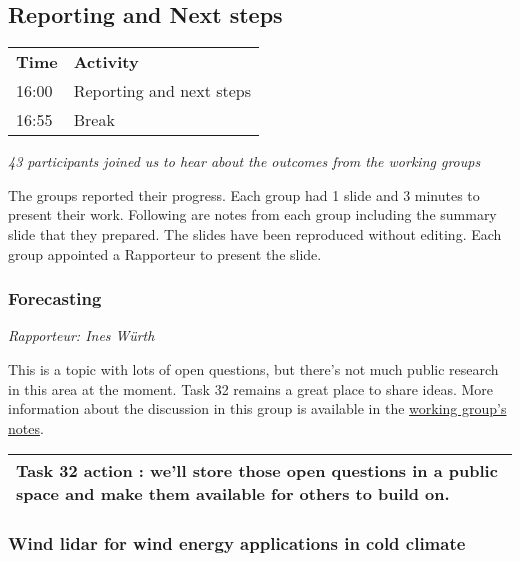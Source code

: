\subsection{Reporting and Next steps}

\begin{table}[!h]
    \centering
    \begin{tabular}{@{}|p{}|p{}|@{}}
    \rowcolor{Task32Blue2} \textbf{Time} & \textbf{Activity} \\    
    16:00 & Reporting and next steps \\
    16:55 & Break
    \end{tabular}
    \label{tab:day4-results-agenda}
\end{table}

\emph{43 participants joined us to hear about the outcomes from the working groups}

The groups reported their progress. Each group had 1 slide and 3 minutes to present their work. Following are notes from each group including the summary slide that they prepared. The slides have been reproduced without editing. Each group appointed a Rapporteur to present the slide.

\hypertarget{forecasting}{%
\subsubsection{Forecasting}\label{forecasting}}

\emph{Rapporteur: Ines Würth}

This is a topic with lots of open questions, but there's not much public
research in this area at the moment. Task 32 remains a great place to
share ideas. More information about the discussion in this group is
available in the
\href{https://docs.google.com/document/d/1Yq2JyWJAEZVAJE9te4FJ-57OpXdxNRHWhks88l2YJcI/edit?usp=sharing}{working
group's notes}.

\begin{longtable}[]{@{}l@{}}
\toprule
\textbf{Task 32 action} : we'll store those open questions in a public
space and make them available for others to build on.\tabularnewline
\midrule
\endhead
\bottomrule
\end{longtable}

\hypertarget{wind-lidar-for-wind-energy-applications-in-cold-climate}{%
\subsubsection{Wind lidar for wind energy applications in cold
climate}\label{wind-lidar-for-wind-energy-applications-in-cold-climate}}

